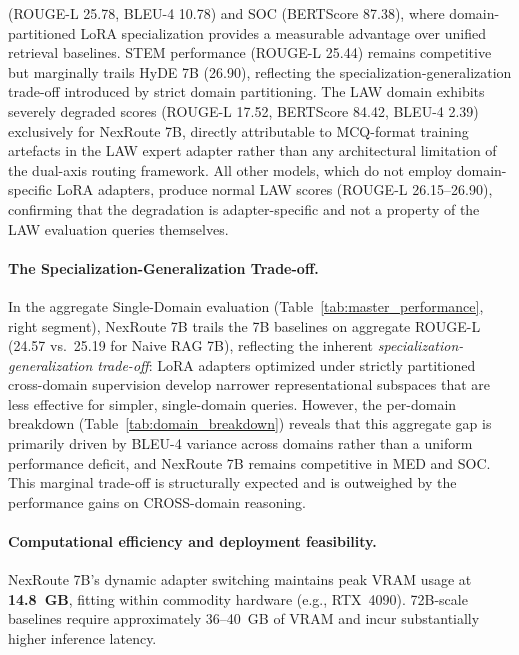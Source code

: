 \documentclass[a4paper,fleql]{cas-sc}
\begin{document}
(ROUGE-L 25.78, BLEU-4 10.78) and SOC (BERTScore 87.38), where
domain-partitioned LoRA specialization provides a measurable advantage over
unified retrieval baselines. STEM performance (ROUGE-L 25.44) remains
competitive but marginally trails HyDE 7B (26.90), reflecting the
specialization-generalization trade-off introduced by strict domain
partitioning. The LAW domain exhibits severely degraded scores (ROUGE-L 17.52,
BERTScore 84.42, BLEU-4 2.39) exclusively for NexRoute 7B, directly
attributable to MCQ-format training artefacts in the LAW expert adapter rather
than any architectural limitation of the dual-axis routing framework. All other
models, which do not employ domain-specific LoRA adapters, produce normal LAW
scores (ROUGE-L 26.15--26.90), confirming that the degradation is adapter-specific
and not a property of the LAW evaluation queries themselves.

\paragraph{The Specialization-Generalization Trade-off.}
In the aggregate Single-Domain evaluation
(Table~\ref{tab:master_performance}, right segment), NexRoute 7B trails the
7B baselines on aggregate ROUGE-L (24.57 vs.\ 25.19 for Naive RAG 7B),
reflecting the inherent \emph{specialization-generalization trade-off}: LoRA
adapters optimized under strictly partitioned cross-domain supervision develop
narrower representational subspaces that are less effective for simpler,
single-domain queries. However, the per-domain breakdown
(Table~\ref{tab:domain_breakdown}) reveals that this aggregate gap is
primarily driven by BLEU-4 variance across domains rather than a uniform
performance deficit, and NexRoute 7B remains competitive in MED and SOC.
This marginal trade-off is structurally expected and is outweighed by the
performance gains on CROSS-domain reasoning.

\paragraph{Computational efficiency and deployment feasibility.}
NexRoute 7B's dynamic adapter switching maintains peak VRAM usage at
\textbf{14.8~GB}, fitting within commodity hardware (e.g., RTX~4090).
72B-scale baselines require approximately 36--40~GB of VRAM and incur
substantially higher inference latency.
\end{document}
